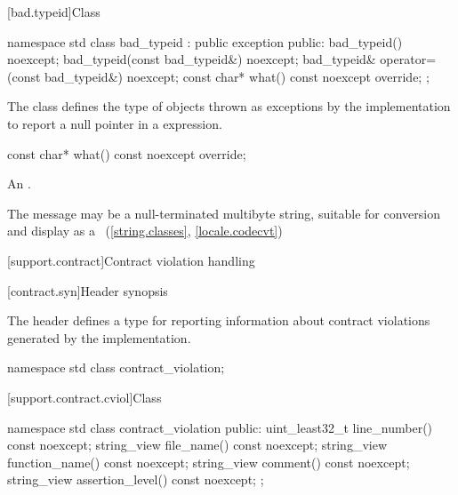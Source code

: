 [bad.typeid]{Class }

%
%
\begin{codeblock}
namespace std {
  class bad_typeid : public exception {
  public:
    bad_typeid() noexcept;
    bad_typeid(const bad_typeid&) noexcept;
    bad_typeid& operator=(const bad_typeid&) noexcept;
    const char* what() const noexcept override;
  };
}
\end{codeblock}

\pnum
The class
defines the type of objects
thrown as exceptions by the implementation to report a null pointer
in a
expression.

%
\begin{itemdecl}
const char* what() const noexcept override;
\end{itemdecl}

\begin{itemdescr}
\pnum
\returns
An  \ntbs{}.

\pnum
\remarks
The message may be a null-terminated multibyte string,
suitable for conversion and display as a
~(\ref{string.classes}, \ref{locale.codecvt})
\end{itemdescr}

[support.contract]{Contract violation handling}

[contract.syn]{Header  synopsis}

The header  defines a type
for reporting information about contract violations
generated by the implementation.
\begin{codeblock}
namespace std {
  class contract_violation;
}
\end{codeblock}

[support.contract.cviol]{Class }
%

\begin{codeblock}
namespace std {
  class contract_violation {
  public:
    uint_least32_t line_number() const noexcept;
    string_view file_name() const noexcept;
    string_view function_name() const noexcept;
    string_view comment() const noexcept;
    string_view assertion_level() const noexcept;
  };
}
\end{codeblock}

